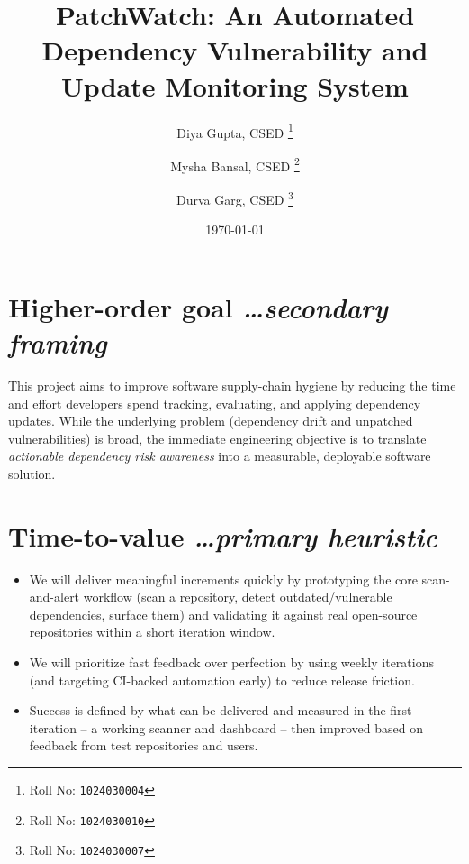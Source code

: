 \documentclass[11pt,a4paper]{article}
\title{PatchWatch: An Automated Dependency Vulnerability and Update Monitoring System}
\author{
  Diya Gupta, CSED%
  \thanks{Roll No: \texttt{1024030004}}
  \and 
  Mysha Bansal, CSED%
  \thanks{Roll No: \texttt{1024030010}}
  \and 
  Durva Garg, CSED%
  \thanks{Roll No: \texttt{1024030007}}
}
\date{\today}
\newcommand{\BvrHint}[1]{%
  {\normalfont\normalsize\itshape\hfill #1}}
\begin{document}
\maketitle

\section{Higher-order goal%
  \BvrHint{\ldots secondary framing}}
This project aims to improve software supply-chain
hygiene by reducing the time and effort developers spend
tracking, evaluating, and applying dependency updates.
While the underlying problem (dependency drift and
unpatched vulnerabilities) is broad, the immediate
engineering objective is to translate \emph{actionable
  dependency risk awareness} into a measurable, deployable
software solution.

\section{Time-to-value %
\BvrHint{\ldots primary heuristic}}
\begin{itemize}[leftmargin=0.7cm]
    \item We will deliver meaningful increments quickly by prototyping the core scan-and-alert workflow (scan a repository, detect outdated/vulnerable dependencies, surface them) and validating it against real open-source repositories within a short iteration window.
    \item We will prioritize fast feedback over perfection by using weekly iterations (and targeting CI-backed automation early) to reduce release friction.
    \item Success is defined by what can be delivered and measured in the first iteration -- a working scanner and dashboard -- then improved based on feedback from test repositories and users.
\end{itemize}
\end{document}
